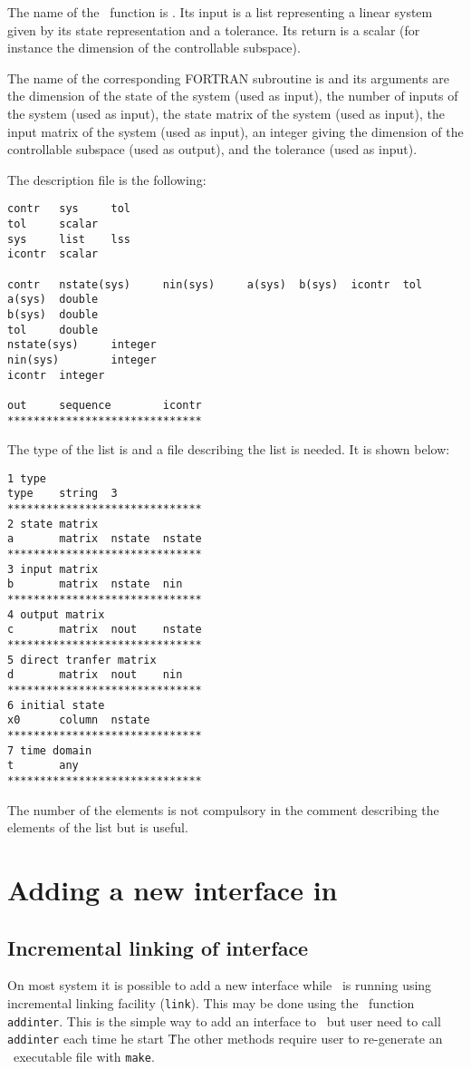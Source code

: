 The name of the \SCI\ function is . Its input is a list representing
a linear system given by its state representation and a tolerance. Its return
is a scalar (for instance the dimension of the controllable subspace).

The name of the corresponding FORTRAN subroutine is  and its
arguments are the dimension of the state of the system (used as input), the
number of inputs of the system (used as input), 
the state matrix of the system (used as input),
the input matrix of the system (used as input),
an integer giving the dimension of the controllable subspace (used as output),
and the tolerance (used as input).

The description file is the following:
\begin{verbatim}
contr   sys     tol
tol     scalar
sys     list    lss
icontr  scalar

contr   nstate(sys)     nin(sys)     a(sys)  b(sys)  icontr  tol
a(sys)  double
b(sys)  double
tol     double
nstate(sys)     integer
nin(sys)        integer
icontr  integer

out     sequence        icontr
******************************
\end{verbatim}

The type of the list is  and a file describing the list  is
needed. It is shown below:

\begin{verbatim}
1 type
type    string  3
******************************
2 state matrix
a       matrix  nstate  nstate
******************************
3 input matrix
b       matrix  nstate  nin
******************************
4 output matrix
c       matrix  nout    nstate
******************************
5 direct tranfer matrix
d       matrix  nout    nin
******************************
6 initial state
x0      column  nstate
******************************
7 time domain
t       any
******************************
\end{verbatim}

The number of the elements is not compulsory in the comment describing the
elements of the list but is useful.
\section{Adding a new interface in \SCI}
\subsection {Incremental linking of interface}
On most system it is possible to add a new interface while \SCI\ is
running using incremental linking facility ({\tt link}). This may be
done using the \SCI\ function {\tt addinter}. This is the simple way
to add an interface to \SCI\, but user need to call {\tt addinter}
each time he start \SCI\. 
The other methods require user to re-generate an \SCI\
executable file with {\tt make}.

